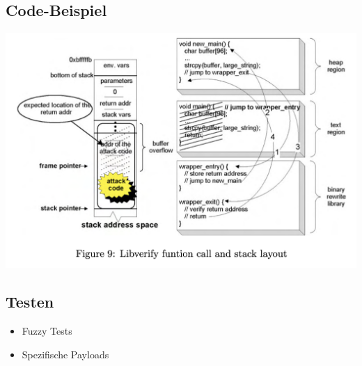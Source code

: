 
\subsection{Code-Beispiel}
    \begin{center}
        \includegraphics[width=\textwidth,height=0.75\textheight,keepaspectratio]{images/Libverify.png}
    \end{center}

\subsection{Testen}
    \begin{itemize}
        \item Fuzzy Tests
        \item Spezifische Payloads
    \end{itemize}
